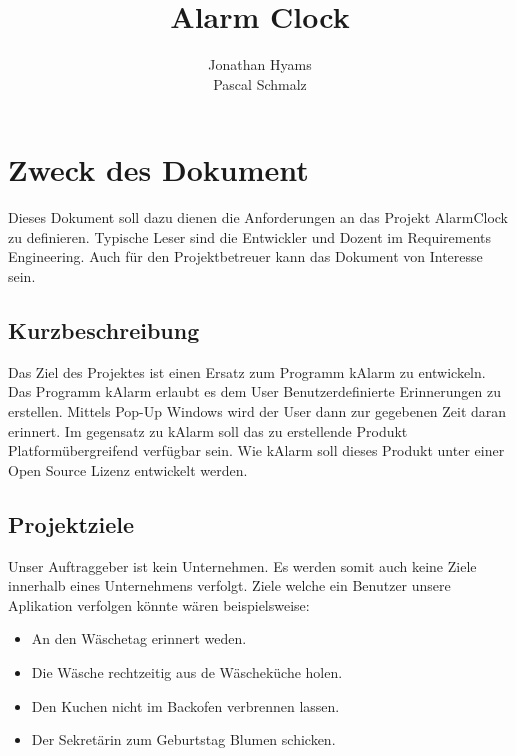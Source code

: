 \documentclass[11pt,titelpage]{scrartcl}
\title{Alarm Clock }
\author{Jonathan Hyams \\Pascal Schmalz}
\begin{document}
\thispagestyle{empty}
\maketitle
\tableofcontents

\pagestyle{fancy}


\begin{abstract}
\end{abstract}
\chapter{Zweck des Dokument}
Dieses Dokument soll dazu dienen die Anforderungen an das Projekt AlarmClock zu definieren. Typische Leser sind die Entwickler und  Dozent im Requirements Engineering. Auch für den Projektbetreuer kann das Dokument von Interesse sein.

\section{Kurzbeschreibung}
Das Ziel des Projektes ist einen Ersatz zum Programm kAlarm zu entwickeln.
Das Programm kAlarm erlaubt es dem User Benutzerdefinierte Erinnerungen zu erstellen. Mittels Pop-Up Windows wird der User dann zur gegebenen Zeit daran erinnert.
Im gegensatz zu kAlarm soll das zu erstellende Produkt Platformübergreifend verfügbar sein. Wie kAlarm soll dieses Produkt unter einer Open Source Lizenz entwickelt werden.
\section{Projektziele}
Unser Auftraggeber ist kein Unternehmen. Es werden somit auch keine Ziele innerhalb eines Unternehmens verfolgt.
Ziele welche ein Benutzer unsere Aplikation verfolgen könnte wären beispielsweise:
\begin{itemize}
 \item An den Wäschetag erinnert weden.
 \item Die Wäsche rechtzeitig aus de Wäscheküche holen.
\item Den Kuchen nicht im Backofen verbrennen lassen.
 \item Der Sekretärin zum Geburtstag Blumen schicken.

\end{itemize}
\end{document}
